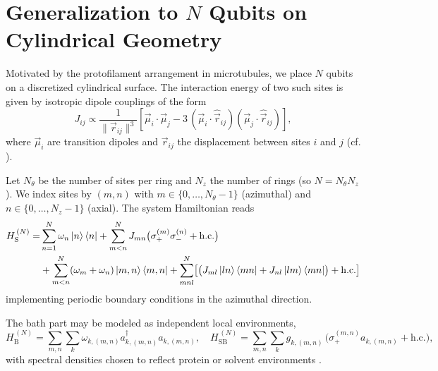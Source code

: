 
\section{Generalization to \texorpdfstring{$N$}{N} Qubits on Cylindrical Geometry}

Motivated by the protofilament arrangement in microtubules, we place $N$ qubits on a discretized cylindrical surface. The interaction energy of two such sites is given by isotropic dipole couplings of the form \cite{griffiths2013introductionelectrodynamics}
\begin{equation}
	J_{ij} \propto \frac{1}{ \lVert \vec{r}_{ij} \rVert^{3} }
	\left[
		\vec{\mu}_i \cdot \vec{\mu}_j - 3\,(\vec{\mu}_i \cdot \hat{\vec{r}}_{ij})(\vec{\mu}_j \cdot \hat{\vec{r}}_{ij})
		\right],
	\label{eq:dipole_dipole}
\end{equation}
where $\vec{\mu}_i$ are transition dipoles and $\vec{r}_{ij}$ the displacement between sites $i$ and $j$ (cf. \cite{lehmberg1970radiationatomsystem,masters2014pathsforstersresonance}).

Let $N_{\theta}$ be the number of sites per ring and $N_{z}$ the number of rings (so $N = N_{\theta} N_{z}$). We index sites by $(m,n)$ with $m\in\{0,\dots,N_{\theta}-1\}$ (azimuthal) and $n\in\{0,\dots,N_{z}-1\}$ (axial). The system Hamiltonian reads
\begin{align}
	H_{\mathrm{S}}^{\,(N)} = & \sum_{n=1}^{N} \omega_{n} \ket{n}\bra{n} + \sum_{m<n}^{N} J_{mn} \bigl( \sigma_{+}^{(m)} \sigma_{-}^{(n)} + \mathrm{h.c.} \bigr) \\
	                         & + \sum_{m<n}^{N} (\omega_{m} + \omega_{n}) \ket{m, n}\bra{m, n}
	+ \sum_{m n l}^{N} \bigl[ \bigl( J_{ml} \ket{ln}\bra{mn}
		+ J_{nl} \ket{lm}\bra{mn} \bigr) + \mathrm{h.c.} \bigr]
	\label{eq:Nqubit_hamiltonian}
\end{align}
implementing periodic boundary conditions in the azimuthal direction.

The bath part may be modeled as independent local environments,
\begin{equation}
	H_{\mathrm{B}}^{\,(N)} = \sum_{m,n} \sum_{k} \omega_{k,(m,n)} a_{k,(m,n)}^{\dagger} a_{k,(m,n)},
	\quad
	H_{\mathrm{SB}}^{\,(N)} = \sum_{m,n} \sum_{k} g_{k,(m,n)}\,\bigl( \sigma_{+}^{(m,n)} a_{k,(m,n)} + \mathrm{h.c.} \bigr),
	\label{eq:Nqubit_bath}
\end{equation}
with spectral densities chosen to reflect protein or solvent environments \cite{rodenetal2012accountingintramolecularvibrational,ritscheleisfeld2014analyticrepresentationsbath}.


